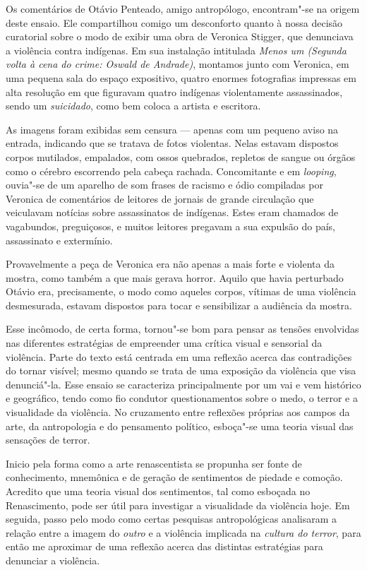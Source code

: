 Os comentários de Otávio Penteado, amigo antropólogo, encontram"-se na origem deste ensaio. Ele compartilhou comigo um desconforto quanto à nossa decisão
curatorial sobre o modo de exibir uma obra de Veronica Stigger, que denunciava a violência contra indígenas. Em sua instalação intitulada \emph{Menos um (Segunda
volta à cena do crime: Oswald de Andrade)}, montamos junto com Veronica,
em uma pequena sala do espaço expositivo, quatro enormes fotografias
impressas em alta resolução em que figuravam quatro indígenas
violentamente assassinados, sendo um \emph{suicidado}, como bem coloca a
artista e escritora.

As imagens foram exibidas sem censura --- apenas com um pequeno aviso na
entrada, indicando que se tratava de fotos violentas. Nelas estavam
dispostos corpos mutilados, empalados, com ossos quebrados, repletos de
sangue ou órgãos como o cérebro escorrendo pela cabeça rachada.
Concomitante e em \emph{looping}, ouvia"-se de um aparelho de som frases
de racismo e ódio compiladas por Veronica de comentários de leitores de
jornais de grande circulação que veiculavam notícias sobre assassinatos
de indígenas. Estes eram chamados de vagabundos, preguiçosos, e muitos
leitores pregavam a sua expulsão do país, assassinato e extermínio.

Provavelmente a peça de Veronica era não apenas a mais forte e
violenta da mostra, como também a que mais gerava horror. Aquilo que
havia perturbado Otávio era, precisamente, o modo como
aqueles corpos, vítimas de uma violência desmesurada, estavam dispostos
para tocar e sensibilizar a audiência da mostra.

Esse incômodo, de certa forma,
tornou"-se bom para pensar as tensões envolvidas nas diferentes
estratégias de empreender uma crítica visual e sensorial da violência.
Parte do texto está centrada em uma reflexão acerca das contradições do
tornar visível; mesmo quando se trata de uma exposição da violência que
visa denunciá"-la. Esse ensaio se caracteriza principalmente por um vai e
vem histórico e geográfico, tendo como fio condutor questionamentos
sobre o medo, o terror e a visualidade da violência. No cruzamento entre
reflexões próprias aos campos da arte, da antropologia e do pensamento
político, esboça"-se uma teoria visual das sensações de terror.

Inicio pela forma como a arte renascentista se propunha
ser fonte de conhecimento, mnemônica e de geração de sentimentos de
piedade e comoção. Acredito que uma teoria visual dos sentimentos, tal
como esboçada no Renascimento, pode ser útil para investigar a
visualidade da violência hoje. Em seguida, passo pelo modo como certas
pesquisas antropológicas analisaram a relação entre a imagem do
\emph{outro} e a violência implicada na \emph{cultura do terror}, para
então me aproximar de uma reflexão acerca das distintas estratégias para
denunciar a violência.

